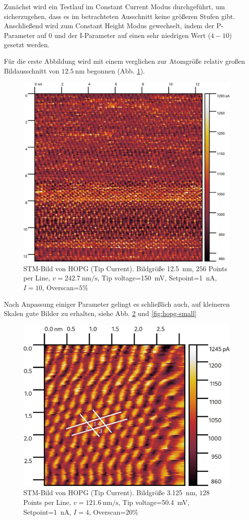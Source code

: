 \documentclass{article}
\begin{document}
Zunächst wird ein Testlauf im Constant Current Modus durchgeführt, um sicherzugehen, dass
es im betrachteten Ausschnitt keine größeren Stufen gibt.
Anschließend wird zum Constant Height Modus gewechselt, indem der P-Parameter auf $0$ und der
I-Parameter auf einen sehr niedrigen Wert ($4 - 10$) gesetzt werden.

Für die erste Abbildung wird mit einem verglichen zur Atomgröße relativ großen Bildausschnitt von $\SI{12.5}{\nm}$ begonnen (Abb. \ref{fig:hopg-large}). 
\begin{figure}[h]
    \centering
    \includegraphics[width=0.5\linewidth]{figure/hopg-large.jpg}
    \caption{STM-Bild von HOPG (Tip Current). Bildgröße \SI{12.5}{\nm}, $256$ Points per Line,
    $v=\SI{242.7}{\nm\per\s}$, Tip voltage=\SI{150}{\mV}, Setpoint=\SI{1}{\nA}, $I=10$, Overscan=$5\%$}
    \label{fig:hopg-large}
\end{figure}

Nach Anpassung einiger Parameter gelingt es schließlich auch, auf kleineren Skalen gute Bilder zu erhalten, siehe Abb. \ref{fig:hopg-medium} und \ref{fig:hopg-small}
\begin{figure}
    \centering
    \includegraphics[width=0.5\linewidth]{figure/hopg-medium.jpg}
    \caption{
        STM-Bild von HOPG (Tip Current). Bildgröße \SI{3.125}{\nm}, $128$ Points per Line,
        $v=\SI{121.6}{\nm\per\s}$, Tip voltage=\SI{50.4}{\mV}, Setpoint=\SI{1}{\nA}, $I=4$, Overscan=$20\%$
    }
    \label{fig:hopg-medium}
\end{figure}
\end{document}
